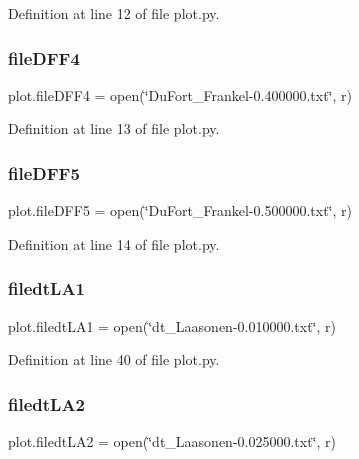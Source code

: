 Definition at line 12 of file plot.\+py.

\mbox{\label{namespaceplot_a3aa2afb6d662b6201dd47b45e014e965}} 
\subsubsection{file\+D\+F\+F4}
{\footnotesize\ttfamily plot.\+file\+D\+F\+F4 = open(\char`\"{}Du\+Fort\+\_\+\+Frankel-\/0.\+400000.txt\char`\"{}, \textquotesingle{}r\textquotesingle{})}



Definition at line 13 of file plot.\+py.

\mbox{\label{namespaceplot_a09596a7a33b21e0019afd498c55f268c}} 
\subsubsection{file\+D\+F\+F5}
{\footnotesize\ttfamily plot.\+file\+D\+F\+F5 = open(\char`\"{}Du\+Fort\+\_\+\+Frankel-\/0.\+500000.txt\char`\"{}, \textquotesingle{}r\textquotesingle{})}



Definition at line 14 of file plot.\+py.

\mbox{\label{namespaceplot_a76898568770c94df2d15ef9ae55ea1ad}} 
\subsubsection{filedt\+L\+A1}
{\footnotesize\ttfamily plot.\+filedt\+L\+A1 = open(\char`\"{}dt\+\_\+\+Laasonen-\/0.\+010000.txt\char`\"{}, \textquotesingle{}r\textquotesingle{})}



Definition at line 40 of file plot.\+py.

\mbox{\label{namespaceplot_aeee1e5e6354faf94aaec77d884bdcfb6}} 
\subsubsection{filedt\+L\+A2}
{\footnotesize\ttfamily plot.\+filedt\+L\+A2 = open(\char`\"{}dt\+\_\+\+Laasonen-\/0.\+025000.txt\char`\"{}, \textquotesingle{}r\textquotesingle{})}



